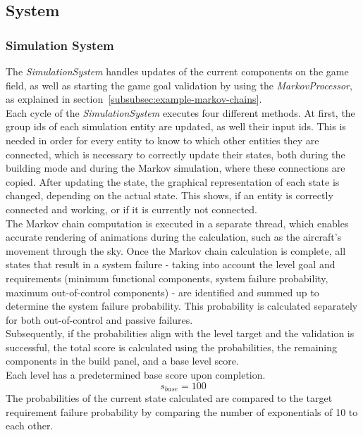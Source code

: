 \subsection{System}\label{subsec:system}
\subsubsection{Simulation System}\label{subsubsec:simulation-system}
The \textit{SimulationSystem} handles updates of the current components on the game field, as well as starting the game goal
validation by using the \textit{MarkovProcessor}, as explained in section~\ref{subsubsec:example-markov-chains}.
\\
Each cycle of the \textit{SimulationSystem} executes four different methods.
At first, the group ids of each simulation entity are updated, as well their input ids.
This is needed in order for every entity to know to which other entities they are connected, which is necessary to correctly
update their states, both during the building mode and during the Markov simulation, where these connections are copied.
After updating the state, the graphical representation of each state is changed, depending on the actual state.
This shows, if an entity is correctly connected and working, or if it is currently not connected.
\\
The Markov chain computation is executed in a separate thread, which enables accurate rendering of animations during
the calculation, such as the aircraft's movement through the sky.
Once the Markov chain calculation is complete, all states that result in a system failure - taking into account the level goal and
requirements (minimum functional components, system failure probability, maximum out-of-control components) - are identified and
summed up to determine the system failure probability.
This probability is calculated separately for both out-of-control and passive failures.
\\
Subsequently, if the probabilities align with the level target and the validation is successful, the total score is calculated using the probabilities,
the remaining components in the build panel, and a base level score.
\\
Each level has a predetermined base score upon completion.
\begin{equation}
    s_{base} = 100
    \label{eq:base-score}
\end{equation}
The probabilities of the current state calculated are compared to the target requirement failure probability by comparing the number of exponentials of 10 to each other.
